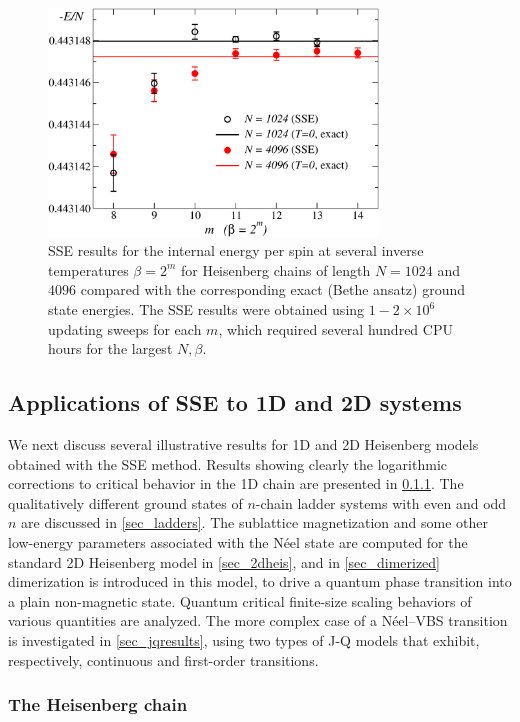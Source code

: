 \documentclass[draft,numberedheadings]{aipproc}
\begin{document}
\begin{figure}
\includegraphics[width=8.75cm, clip]{ecomp.eps}
\caption{SSE results for the internal energy per spin at several inverse temperatures $\beta=2^m$ for Heisenberg chains of length $N=1024$ and $4096$ compared 
with the corresponding exact (Bethe ansatz) ground state energies. The SSE results were obtained using $1-2 \times 10^6$ updating sweeps for each $m$, which
required several hundred CPU hours for the largest $N,\beta$.}
\label{ecomp}
\end{figure}

\subsection{Applications of SSE to 1D and 2D systems}
\label{sec_sseapplications}

We next discuss several illustrative results for 1D and 2D Heisenberg models obtained with the SSE method. Results showing clearly the logarithmic corrections 
to critical behavior in the 1D chain are presented in \ref{sec_chainsse}. The qualitatively different ground states of $n$-chain ladder systems with even and
odd $n$ are discussed in \ref{sec_ladders}. The sublattice magnetization and some other low-energy parameters associated with the N\'eel state are computed for 
the standard 2D Heisenberg model in \ref{sec_2dheis}, and in \ref{sec_dimerized} dimerization is introduced in this model, to drive a quantum phase transition into 
a plain non-magnetic state. Quantum critical finite-size scaling behaviors of various quantities are analyzed. The more complex case of a N\'eel--VBS transition 
is investigated in \ref{sec_jqresults}, using two types of J-Q models that exhibit, respectively, continuous and first-order transitions.

\subsubsection{The Heisenberg chain}
\label{sec_chainsse}
\end{document}
